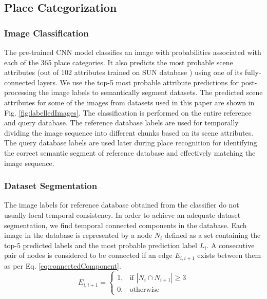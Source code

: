 \documentclass[letterpaper, 10 pt, conference]{ieeeconf}  %
\begin{document}
\subsection{Place Categorization}

\subsubsection{Image Classification}
The pre-trained CNN model classifies an image with probabilities associated with each of the 365 place categories. It also predicts the most probable scene attributes (out of 102 attributes trained on SUN database \cite{Patterson2012SunAttributes}) using one of its fully-connected layers. We use the top-5 most probable attribute predictions for post-processing the image labels to semantically segment datasets. The predicted scene attributes for some of the images from datasets used in this paper are shown in Fig. \ref{fig:labelledImages}. The classification is performed on the entire reference and query database. The reference database labels are used for temporally dividing the image sequence into different chunks based on its scene attributes. The query database labels are used later during place recognition for identifying the correct semantic segment of reference database and effectively matching the image sequence.

\subsubsection{Dataset Segmentation}
The image labels for reference database obtained from the classifier do not usually local temporal consistency. In order to achieve an adequate dataset segmentation, we find temporal connected components in the database. Each image in the database is represented by a node $N_i$ defined as a set containing the top-5 predicted labels and the most probable prediction label $L_i$. A consecutive pair of nodes is considered to be connected if an edge $E_{i,i+1}$ exists between them as per Eq. \ref{eq:connectedComponent}.
\begin{equation}
 E_{i,i+1} = 
 \begin{cases}
  1, & \text{if } \left\vert{N_i \cap N_{i+1}}\right\vert \geq 3\\
  0, & \text{otherwise}
 \end{cases}
 \label{eq:connectedComponent}
\end{equation}
\end{document}
